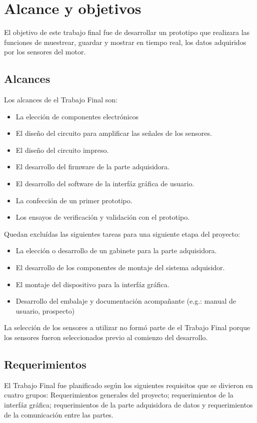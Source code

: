 \section{Alcance y objetivos}

El objetivo de este trabajo final fue de desarrollar un prototipo que realizara las funciones de muestrear, guardar y mostrar en tiempo real, los datos adquiridos por los sensores del motor.

\subsection{Alcances}

Los alcances de el Trabajo Final son:
\begin{itemize}
\item La elección de componentes electrónicos
\item El diseño del circuito para amplificar las señales de los sensores.
\item El diseño del circuito impreso.
\item El desarrollo del firmware de la parte adquisidora.
\item El desarrollo del software de la interfáz gráfica de usuario.
\item La confección de un primer prototipo.
\item Los ensayos de verificación y validación con el prototipo.
\end{itemize}

Quedan excluídas las siguientes tareas para una siguiente etapa del proyecto:
\begin{itemize}
\item La elección o desarrollo de un gabinete para la parte adquisidora.
\item El desarrollo de los componentes de montaje del sistema adquisidor.
\item El montaje del dispositivo para la interfáz gráfica.
\item Desarrollo del embalaje y documentación acompañante (e.g.: manual de usuario, prospecto)
\end{itemize}

La selección de los sensores a utilizar no formó parte de el Trabajo Final porque los sensores fueron seleccionados previo al comienzo del desarrollo.

\subsection{Requerimientos}
El Trabajo Final fue planificado según los siguientes requisitos que se divieron en cuatro grupos: Requerimientos generales del proyecto; requerimientos de la interfáz gráfica; requerimientos de la parte adquisidora de datos y requerimientos de la comunicación entre las partes.

